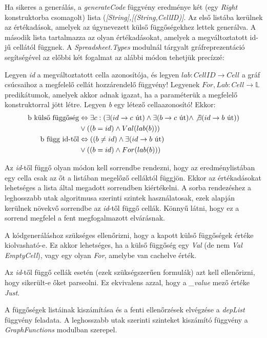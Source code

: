 Ha sikeres a generálás, a \textit{generateCode} függvény eredménye két (egy \textit{Right} konstruktorba csomagolt) lista (\textit{[String],[(String,CellID)]}. Az első listába kerülnek az értékadások, amelyek az úgynevezett külső függőségekhez lettek generálva. A második lista tartalmazza az olyan értékadásokat, amelyek a megváltoztatott id-jű cellától függnek. A \textit{Spreadsheet.Types} modulnál tárgyalt gráfreprezentáció segítségével az előbbi két fogalmat az alábbi módon tehetjük precízzé: 

Legyen \textit{id} a megváltoztatott cella azonosítója, és legyen $lab : CellID \rightarrow Cell$ a gráf csúcsaihoz a megfelelő cellát hozzárendelő függvény! Legyenek $For,Lab : Cell \rightarrow \mathbb{L}$ predikátumok, amelyek akkor adnak igazat, ha a paraméterük a megfelelő konstruktorral jött létre. Legyen \textit{b} egy létező cellaazonosító! Ekkor:
\begin{align*}
	\text{b külső függőség} &\Leftrightarrow \exists c: (\exists (id \rightarrow c \text{ út}) \wedge \exists (b \rightarrow c \text{ út}) \wedge \not\exists  (id \rightarrow b \text{ út})) \\
	& \vee((b=id) \wedge Val(lab(b))) \\
	\text{b függ id-től} &\Leftrightarrow ((b \not= id) \wedge \exists (id \rightarrow b \text{ út}) \\
	&\vee ((b = id) \wedge For(lab(b)))
\end{align*}

Az \textit{id}-től függő olyan módon kell sorrendbe rendezni, hogy az eredménylistában egy cella csak az őt a listában megelőző celláktól függjön. Ekkor az értékadásokat lehetséges a lista által megadott sorrendben kiértékelni. A sorba rendezéshez a leghosszabb utak algoritmusa szerinti szintek használatosak, ezek alapján kerülnek növekvő sorrendbe az \textit{id}-től függő cellák. Könnyű látni, hogy ez a sorrend megfelel a fent megfogalmazott elvárásnak.  

A kódgeneráláshoz szükséges ellenőrizni, hogy a kapott külső függőségek értéke kiolvasható-e. Ez akkor lehetséges, ha a külső függőség egy \textit{Val} (de nem \textit{Val EmptyCell}), vagy egy olyan \textit{For}, amelybe van cachelve érték.

Az \textit{id}-től függő cellák esetén (ezek szükségszerűen formulák) azt kell ellenőrizni, hogy sikerült-e őket parseolni. Ez ekvivalens azzal, hogy a \textit{\_value} mező értéke \textit{Just}.

A függőségek listáinak kiszámítása és a fenti ellenőrzések elvégzése a \textit{depList} függvény feladata. A leghosszabb utak szerinti szinteket kiszámító függvény a \textit{GraphFunctions} modulban szerepel. 

